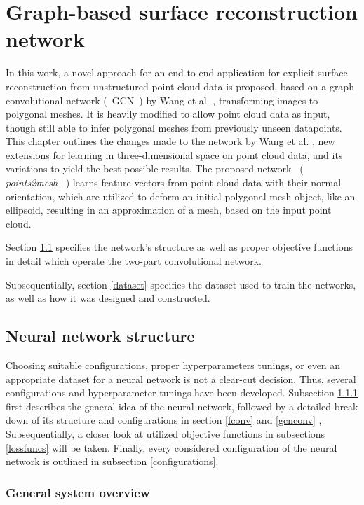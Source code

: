 \chapter{Graph-based surface reconstruction network}
\label{sec:methods}
In this work, a novel approach for an end-to-end application for explicit surface 
reconstruction from unstructured point cloud data is proposed, based on a graph convolutional network (~GCN~) by Wang et al. \cite{wang2018pixel2mesh}, transforming images 
to polygonal meshes. It is heavily modified to allow point cloud data as input, though still able to infer polygonal meshes from previously unseen datapoints. 
This chapter outlines the changes made to the network by Wang et al. , new extensions 
for learning in three-dimensional space on point cloud data, and its variations to
 yield the best possible results. 
The proposed network ~(~ \emph{points2mesh} ~) learns feature vectors from point cloud data with their
 normal orientation, which are utilized to deform an initial polygonal 
 mesh object, like an ellipsoid, resulting in an approximation of a mesh, based on the input point cloud.

Section \ref{networkconfig} specifies the network's structure as well as
 proper objective functions in detail which operate the two-part
  convolutional network.

Subsequentially, section \ref{dataset} specifies the dataset used to
 train the networks, as well as how it was designed and constructed.

\section{Neural network structure}
\label{networkconfig}
Choosing suitable configurations, proper hyperparameters tunings,
 or even an appropriate dataset for a neural network is not a clear-cut decision. 
 Thus, several configurations and hyperparameter tunings have been developed.
  Subsection \ref{generalsystem} first describes the general idea of the neural network, followed by a detailed
   break down of its structure and configurations in section \ref{fconv} and \ref{gcnconv} ,
   Subsequentially, a closer look at utilized objective functions in subsections \ref{lossfuncs} will be taken.
   Finally, every considered configuration of the neural network is outlined in subsection \ref{configurations}.
\subsection{General system overview}
\label{generalsystem}

